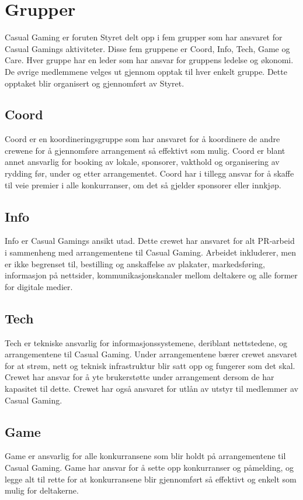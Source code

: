 \section{Grupper}
Casual Gaming er foruten Styret delt opp i fem grupper som har ansvaret for Casual Gamings aktiviteter. Disse fem gruppene er Coord, Info, Tech, Game og Care. Hver gruppe har en leder som har ansvar for gruppens ledelse og økonomi. De øvrige medlemmene velges ut gjennom opptak til hver enkelt gruppe. Dette opptaket blir organisert og gjennomført av Styret.

\subsection{Coord}
Coord er en koordineringsgruppe som har ansvaret for å koordinere de andre crewene for å gjennomføre arrangement så effektivt som mulig. Coord er blant annet ansvarlig for booking av lokale, sponsorer, vakthold og organisering av rydding før, under og etter arrangementet. Coord har i tillegg ansvar for å skaffe til veie premier i alle konkurranser, om det så gjelder sponsorer eller innkjøp.

\subsection{Info}
Info er Casual Gamings ansikt utad. Dette crewet har ansvaret for alt PR­‐arbeid i sammenheng med arrangementene til Casual Gaming. Arbeidet inkluderer, men er ikke begrenset til, bestilling og anskaffelse av plakater, markedsføring, informasjon på nettsider, kommunikasjonskanaler mellom deltakere og alle former for digitale medier.

\subsection{Tech}
Tech er tekniske ansvarlig for informasjonssystemene, deriblant nettstedene, og arrangementene til Casual Gaming. Under arrangementene bærer crewet ansvaret for at strøm, nett og teknisk infrastruktur blir satt opp og fungerer som det skal. Crewet har ansvar for å yte brukerstøtte under arrangement dersom de har kapasitet til dette. Crewet har også ansvaret for utlån av utstyr til medlemmer av Casual Gaming.

\subsection{Game}
Game er ansvarlig for alle konkurransene som blir holdt på arrangementene til Casual Gaming. Game har ansvar for å sette opp konkurranser og påmelding, og legge alt til rette for at konkurransene blir gjennomført så effektivt og enkelt som mulig for deltakerne.

